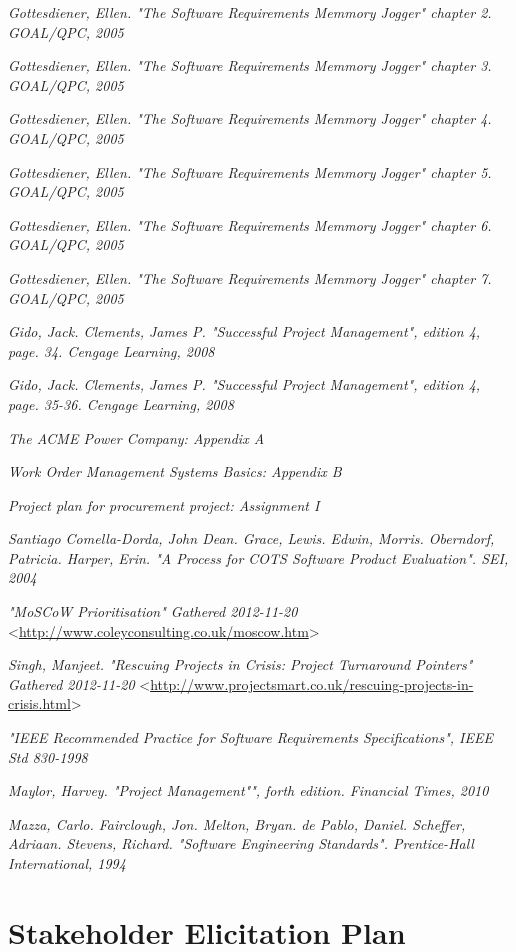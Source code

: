 \documentclass[a4paper]{article}
\begin{document}
\begin{thebibliography}{99}     
	
 \emph{Gottesdiener, Ellen. \textsl{"The Software Requirements Memmory Jogger" chapter 2}. GOAL/QPC, 2005}

 \emph{Gottesdiener, Ellen. \textsl{"The Software Requirements Memmory Jogger" chapter 3}. GOAL/QPC, 2005}

 \emph{Gottesdiener, Ellen. \textsl{"The Software Requirements Memmory Jogger" chapter 4}. GOAL/QPC, 2005}

 \emph{Gottesdiener, Ellen. \textsl{"The Software Requirements Memmory Jogger" chapter 5}. GOAL/QPC, 2005}

 \emph{Gottesdiener, Ellen. \textsl{"The Software Requirements Memmory Jogger" chapter 6}. GOAL/QPC, 2005}

 \emph{Gottesdiener, Ellen. \textsl{"The Software Requirements Memmory Jogger" chapter 7}. GOAL/QPC, 2005}


 \emph{Gido, Jack. Clements, James P. \textsl{"Successful Project Management", edition 4, page. 34}. Cengage Learning, 2008}

 \emph{Gido, Jack. Clements, James P. \textsl{"Successful Project Management", edition 4, page. 35-36}. Cengage Learning, 2008}    

 \emph{The ACME Power Company: Appendix A}

 \emph{Work Order Management Systems Basics: Appendix B}

 \emph{Project plan for procurement project: Assignment I}    

 \emph{Santiago Comella-Dorda, John Dean. Grace, Lewis. Edwin, Morris. Oberndorf, Patricia. Harper, Erin. \textsl{"A Process for COTS Software Product Evaluation"}. SEI, 2004}

 \emph{\textsl{"MoSCoW Prioritisation"} Gathered 2012-11-20} <\url{http://www.coleyconsulting.co.uk/moscow.htm}>

 \emph{Singh, Manjeet. \textsl{"Rescuing Projects in Crisis: Project Turnaround Pointers"} Gathered 2012-11-20} <\url{http://www.projectsmart.co.uk/rescuing-projects-in-crisis.html}> 

 \emph{\textsl{"IEEE Recommended Practice for Software Requirements Specifications", IEEE Std 830-1998}  }      

 \emph{Maylor, Harvey. \textsl{"Project Management"", forth edition}. Financial Times, 2010}

 \emph{Mazza, Carlo. Fairclough, Jon. Melton, Bryan. de Pablo, Daniel. Scheffer, Adriaan. Stevens, Richard. \textsl{"Software Engineering Standards"}. Prentice-Hall International, 1994 } 

\end{thebibliography}
\clearpage
\appendix
\section{Stakeholder Elicitation Plan}

\end{document}
